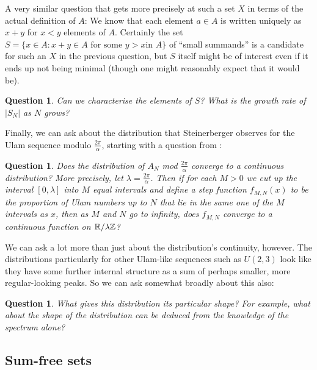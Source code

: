 \documentclass{article}
\newtheorem{question}[theorem]{Question}
\theoremstyle{definition}
\theoremstyle{remark}
\numberwithin{equation}{section}
\begin{document}
A very similar question that gets more precisely at such a set $X$ in
terms of the actual definition of $A$: We know that each element
$a \in A$ is written uniquely as $x+y$ for $x < y$ elements of $A$.
Certainly the set $S = \{x \in A : x + y \in A\text{ for some $y > x$
  in $A$}\}$ of ``small summands'' is a candidate for such an $X$ in
the previous question, but $S$ itself might be of interest even if it
ends up not being minimal (though one might reasonably expect that it
would be).

\begin{question}\label{qn:fulcrum}
  Can we characterise the elements of $S$?  What is the growth rate of
  $|S_N|$ as $N$ grows?
\end{question}

Finally, we can ask about the distribution that Steinerberger observes
for the Ulam sequence modulo $\frac{2\pi}{\alpha}$, starting with a
question from \cite{steinerberger:preprint}: 

\begin{question}\label{qn:continuity}
  Does the distribution of $A_N$ mod $\frac{2\pi}{\alpha}$ converge to
  a continuous distribution?  More precisely, let
  $\lambda = \frac{2\pi}{\alpha}$.  Then if for each $M > 0$ we cut up
  the interval $[0,\lambda]$ into $M$ equal intervals and define a
  step function $f_{M,N}(x)$ to be the proportion of Ulam numbers up
  to $N$ that lie in the same one of the $M$ intervals as $x$, then as
  $M$ and $N$ go to infinity, does $f_{M,N}$ converge to a continuous
  function on $\mathbb{R}/\lambda\mathbb{Z}$?
\end{question}

We can ask a lot more than just about the distribution's continuity,
however.  The distributions particularly for other Ulam-like sequences
such as $U(2,3)$ look like they have some further internal structure
as a sum of perhaps smaller, more regular-looking peaks.  So we can
ask somewhat broadly about this also: 

\begin{question}\label{qn:shape}
  What gives this distribution its particular shape?  For example,
  what about the shape of the distribution can be deduced from the
  knowledge of the spectrum alone?
\end{question}

\subsection{Sum-free sets}
\end{document}
